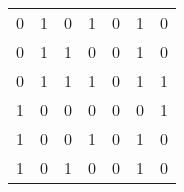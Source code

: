 \begin{tabular}{|c|c|c|c||c|c|c|}
  
  
  0 & 1 & 0 & 1
  
    
    
    & 0
  
    
    
    & 1
  
    
    
    & 0
   \\
  

  
  
  0 & 1 & 1 & 0
  
    
    
    & 0
  
    
    
    & 1
  
    
    
    & 0
   \\
  

  
  
  0 & 1 & 1 & 1
  
    
    
    & 0
  
    
    
    & 1
  
    
    
    & 1
   \\
  \hline

  
  
  1 & 0 & 0 & 0
  
    
    
    & 0
  
    
    
    & 0
  
    
    
    & 1
   \\
  

  
  
  1 & 0 & 0 & 1
  
    
    
    & 0
  
    
    
    & 1
  
    
    
    & 0
   \\
  

  
  
  1 & 0 & 1 & 0
  
    
    
    & 0
  
    
    
    & 1
  
    
    
    & 0
   \\
  


\end{tabular}

